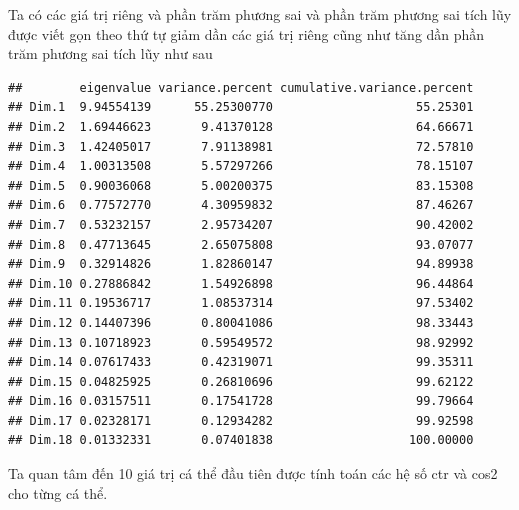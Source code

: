 \documentclass[../thesis.tex]{subfiles}
\begin{document}
Ta có các giá trị riêng và phần trăm phương sai và phần trăm phương sai tích lũy được viết gọn theo thứ tự giảm dần các giá trị riêng cũng như tăng dần phần trăm phương sai tích lũy như sau

\begin{Shaded}
	\begin{Highlighting}[]
\SpecialCharTok{::}
	\end{Highlighting}
\end{Shaded}

\begin{verbatim}
##        eigenvalue variance.percent cumulative.variance.percent
## Dim.1  9.94554139      55.25300770                    55.25301
## Dim.2  1.69446623       9.41370128                    64.66671
## Dim.3  1.42405017       7.91138981                    72.57810
## Dim.4  1.00313508       5.57297266                    78.15107
## Dim.5  0.90036068       5.00200375                    83.15308
## Dim.6  0.77572770       4.30959832                    87.46267
## Dim.7  0.53232157       2.95734207                    90.42002
## Dim.8  0.47713645       2.65075808                    93.07077
## Dim.9  0.32914826       1.82860147                    94.89938
## Dim.10 0.27886842       1.54926898                    96.44864
## Dim.11 0.19536717       1.08537314                    97.53402
## Dim.12 0.14407396       0.80041086                    98.33443
## Dim.13 0.10718923       0.59549572                    98.92992
## Dim.14 0.07617433       0.42319071                    99.35311
## Dim.15 0.04825925       0.26810696                    99.62122
## Dim.16 0.03157511       0.17541728                    99.79664
## Dim.17 0.02328171       0.12934282                    99.92598
## Dim.18 0.01332331       0.07401838                   100.00000
\end{verbatim}

Ta quan tâm đến 10 giá trị cá thể đầu tiên được tính toán các hệ số ctr và cos2 cho từng cá thể.

\begin{Shaded}
	\begin{Highlighting}[]
	\end{Highlighting}
\end{Shaded}
\end{document}
